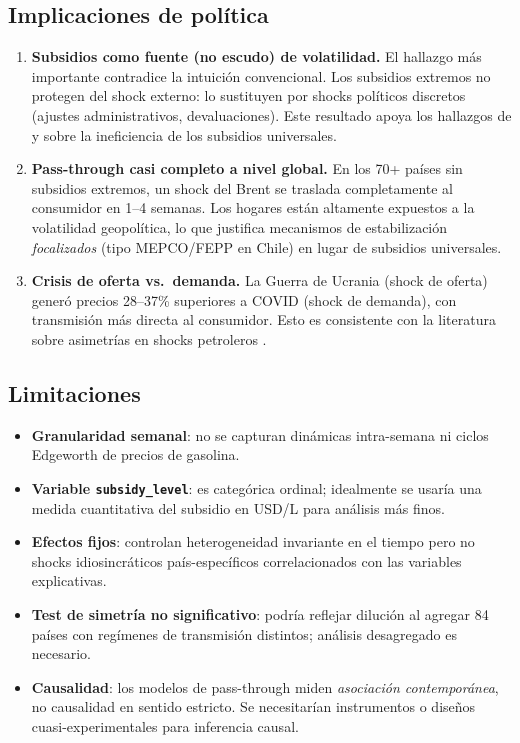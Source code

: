\documentclass[stu, 12pt, a4paper, biblatex, donotrepeattitle]{apa7}
\begin{document}
\subsection{Implicaciones de política}

\begin{enumerate}
  \item \textbf{Subsidios como fuente (no escudo) de volatilidad.} El hallazgo más importante contradice la intuición convencional. Los subsidios extremos no protegen del shock externo: lo sustituyen por shocks políticos discretos (ajustes administrativos, devaluaciones). Este resultado apoya los hallazgos de \textcite{coady2019} y \textcite{parry2021} sobre la ineficiencia de los subsidios universales.

  \item \textbf{Pass-through casi completo a nivel global.} En los 70+ países sin subsidios extremos, un shock del Brent se traslada completamente al consumidor en 1--4 semanas. Los hogares están altamente expuestos a la volatilidad geopolítica, lo que justifica mecanismos de estabilización \emph{focalizados} (tipo MEPCO/FEPP en Chile) en lugar de subsidios universales.

  \item \textbf{Crisis de oferta vs.\ demanda.} La Guerra de Ucrania (shock de oferta) generó precios 28--37\% superiores a COVID (shock de demanda), con transmisión más directa al consumidor. Esto es consistente con la literatura sobre asimetrías en shocks petroleros \parencite{kilian2008, hamilton2011}.
\end{enumerate}

\subsection{Limitaciones}

\begin{itemize}
  \item \textbf{Granularidad semanal}: no se capturan dinámicas intra-semana ni ciclos Edgeworth de precios de gasolina.
  \item \textbf{Variable \texttt{subsidy\_level}}: es categórica ordinal; idealmente se usaría una medida cuantitativa del subsidio en USD/L para análisis más finos.
  \item \textbf{Efectos fijos}: controlan heterogeneidad invariante en el tiempo pero no shocks idiosincráticos país-específicos correlacionados con las variables explicativas.
  \item \textbf{Test de simetría no significativo}: podría reflejar dilución al agregar 84 países con regímenes de transmisión distintos; análisis desagregado es necesario.
  \item \textbf{Causalidad}: los modelos de pass-through miden \emph{asociación contemporánea}, no causalidad en sentido estricto. Se necesitarían instrumentos o diseños cuasi-experimentales para inferencia causal.
\end{itemize}
\end{document}
